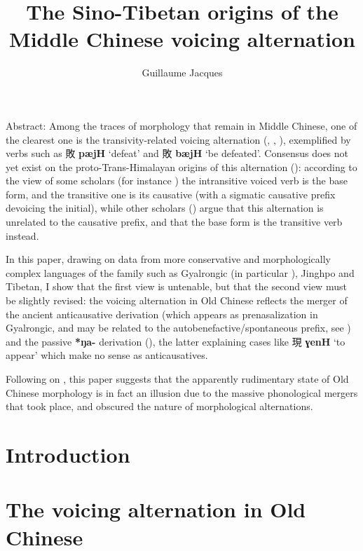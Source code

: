 \documentclass[oneside,a4paper,11pt]{article}
\newcommand{\ipa}[1]{\textbf{{\phon\mbox{#1}}}} %
\newcommand{\zh}[1]{{\cn #1}}
\newcommand{\zhc}[2]{\zh{#1} \ipa{#2}}
\begin{document}
\title{The Sino-Tibetan origins of the Middle Chinese voicing alternation}
\author{Guillaume Jacques}
\maketitle


Abstract: Among the traces of morphology that remain in Middle Chinese, one of the clearest one is the transivity-related voicing alternation (\citealt[79-80]{zhou62goucibian}, \citealt{downer73loanwords}, \citealt{sagart03prenasalized}), exemplified by verbs such as \zhc{敗}{pæjH} `defeat' and \zhc{敗}{bæjH} `be defeated'. Consensus does not yet exist on the proto-Trans-Himalayan origins of this alternation (\citealt{handel12valence}): according to the view of some scholars (for instance \citealt{mei12caus}) the intransitive voiced verb is the base form, and the transitive one is its causative (with a sigmatic causative prefix devoicing the initial), while other scholars (\citealt{sagart12sprefix}) argue that this alternation is unrelated to the causative prefix, and that the base form is the transitive verb instead.

In this paper, drawing on data from more conservative and morphologically complex languages of the family such as Gyalrongic (in particular \citealt{jacques15causative, lai16caus, gong17xingtaixue}), Jinghpo and Tibetan, I show that the first view is untenable, but that the second view must be slightly revised: the voicing alternation in Old Chinese reflects the merger of the ancient anticausative derivation (which appears as prenasalization in Gyalrongic, and may be related to the autobenefactive/spontaneous prefix, see  \citealt{jacques15spontaneous}) and the passive \ipa{*ŋa-} derivation (\citealt{jacques07passif, jacques12demotion}), the latter explaining cases like \zhc{現}{ɣenH} `to appear' which make no sense as anticausatives.

Following on  \citet{jacques16ssuffixes}, this paper suggests that the apparently rudimentary state of Old Chinese morphology is in fact an illusion due to the massive phonological mergers that took place, and obscured the nature of morphological alternations.  

 \section*{Introduction}
 \section{The voicing alternation in Old Chinese}
 \citet[79-80]{zhou62goucibian}
 
\end{document}
